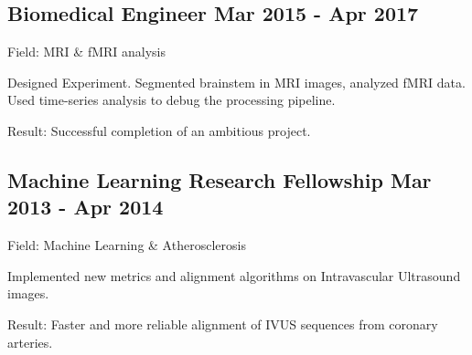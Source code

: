 \documentclass[a4paper,12pt]{article}
\begin{document}

\vspace*{5pt}
\subsection{Biomedical Engineer \hfill Mar 2015 - Apr 2017}
\vspace*{1pt}
Field: MRI \& fMRI analysis
\vspace*{\spaceAfterField}
\begin{zitemize}
\item Designed Experiment. Segmented brainstem in MRI images, analyzed fMRI data. Used time-series analysis to debug the processing pipeline.
\item Result: Successful completion of an ambitious project.
\end{zitemize}




\subsection{Machine Learning Research Fellowship \hfill Mar 2013 - Apr 2014}
\vspace*{1pt}
Field: Machine Learning \& Atherosclerosis
\vspace*{\spaceAfterField}
\begin{zitemize}
\item Implemented new metrics and alignment algorithms on Intravascular Ultrasound images.
\item Result: Faster and more reliable alignment of IVUS sequences from coronary arteries.
\end{zitemize}
\end{document}
